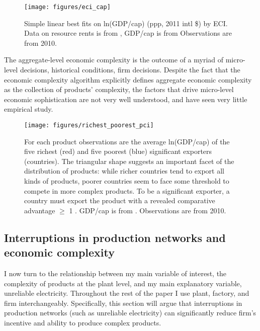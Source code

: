 \documentclass[11pt]{article}
\begin{document}
\begin{figure}[htpb]
	\centering
	\texttt{[image: figures/eci\_cap]}
	\caption[GDP per capita and Economic Complexity]{Simple linear best fits on ln(GDP/cap) (ppp, 2011 intl \$) by ECI. Data on resource rents is from \cite{world_bank_world_2020}, GDP/cap is from \cite{world_bank_world_2020-1} Observations are from 2010.}
	\label{fig:framework-eci-gdp}
\end{figure}

The aggregate-level economic complexity is the outcome of a myriad of micro-level decisions, historical conditions, firm decisions. Despite the fact that the economic complexity algorithm explicitly defines aggregate economic complexity as the collection of products' complexity, the factors that drive micro-level economic sophistication are not very well understood, and have seen very little empirical study.

\begin{figure}[htpb]
	\centering
	\texttt{[image: figures/richest\_poorest\_pci]}
	\caption[Product sophistication by richest and poorest exporters]{For each product observations are the average ln(GDP/cap) of the five richest (red) and five poorest (blue) significant exporters (countries). The triangular shape suggests an important facet of the distribution of products: while richer countries tend to export all kinds of products, poorer countries seem to face some threshold to compete in more complex products. To be a significant exporter, a country must export the product with a revealed comparative advantage \(\geq\) 1  \citep{balassa_trade_1965}. GDP/cap is from \cite{world_bank_world_2020-1}. Observations are from 2010.}%
	\label{fig:framework-least-most}
\end{figure}

\subsection{Interruptions in production networks and economic complexity}
\label{sec:production_networks}
I now turn to the relationship between my main variable of interest, the complexity of products at the plant level, and my main explanatory variable, unreliable electricity. Throughout the rest of the paper I use plant, factory, and firm interchangeably. Specifically, this section will argue that interruptions in production networks (such as unreliable electricity) can significantly reduce firm's incentive and ability to produce complex products.
\end{document}
